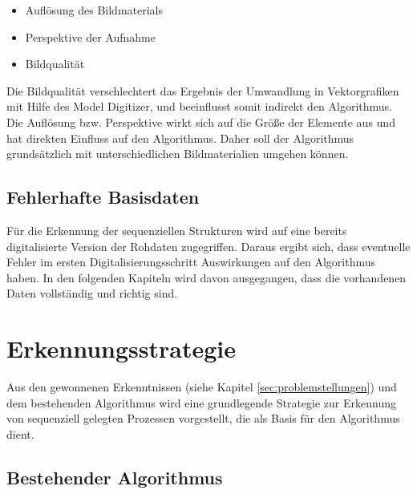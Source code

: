 \begin{itemize}
	\item Auflösung des Bildmaterials
	\item Perspektive der Aufnahme
	\item Bildqualität
\end{itemize}

Die Bildqualität verschlechtert das Ergebnis der Umwandlung in Vektorgrafiken mit Hilfe des Model Digitizer, und beeinflusst somit indirekt den Algorithmus. Die Auflösung bzw. Perspektive wirkt sich auf die Größe der Elemente aus und hat direkten Einfluss auf den Algorithmus. Daher soll der Algorithmus grundsätzlich mit unterschiedlichen Bildmaterialien umgehen können.

\subsection{Fehlerhafte Basisdaten} %
\label{sub:fehlerhafte_basisdaten}
Für die Erkennung der sequenziellen Strukturen wird auf eine bereits digitalisierte Version der Rohdaten zugegriffen. Daraus ergibt sich, dass eventuelle Fehler im ersten Digitalisierungsschritt Auswirkungen auf den Algorithmus haben. In den folgenden Kapiteln wird davon ausgegangen, dass die vorhandenen Daten vollständig und richtig sind.


\section{Erkennungsstrategie} %
\label{sec:erkennungsstrategie}
Aus den gewonnenen Erkenntnissen (siehe Kapitel \ref{sec:problemstellungen}) und dem bestehenden Algorithmus \cite{max} wird eine grundlegende Strategie zur Erkennung von sequenziell gelegten Prozessen vorgestellt, die als Basis für den Algorithmus dient.

\subsection{Bestehender Algorithmus} %
\label{sub:unterscheidung_der_legemethode}


